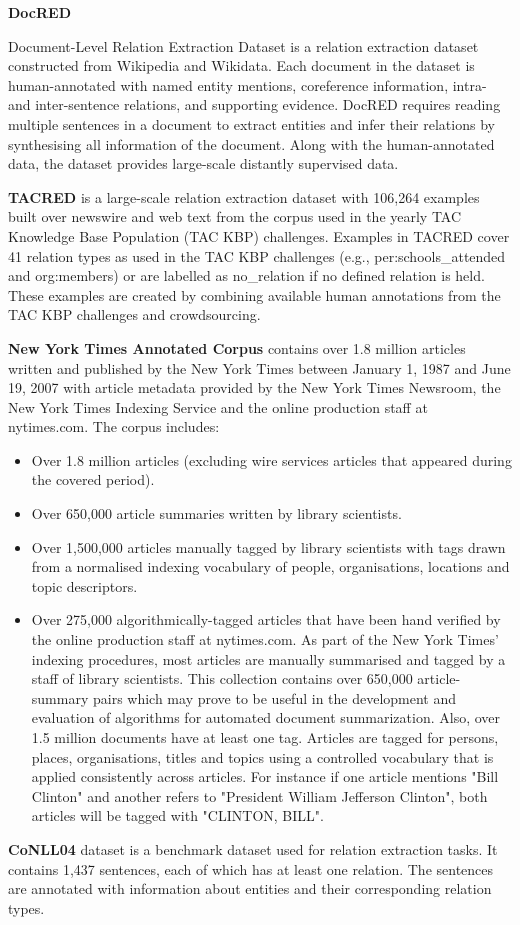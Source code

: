 \documentclass[twocolumn, 11pt]{extarticle}
\begin{document}
\textbf{DocRED}

Document-Level Relation Extraction Dataset is a relation extraction dataset constructed from Wikipedia and Wikidata. Each document in the dataset is human-annotated with named entity mentions, coreference information, intra- and inter-sentence relations, and supporting evidence. DocRED requires reading multiple sentences in a document to extract entities and infer their relations by synthesising all information of the document. Along with the human-annotated data, the dataset provides large-scale distantly supervised data.

\textbf{TACRED} 
is a large-scale relation extraction dataset with 106,264 examples built over newswire and web text from the corpus used in the yearly TAC Knowledge Base Population (TAC KBP) challenges. Examples in TACRED cover 41 relation types as used in the TAC KBP challenges (e.g., per:schools\_attended and org:members) or are labelled as no\_relation if no defined relation is held. These examples are created by combining available human annotations from the TAC KBP challenges and crowdsourcing.

\textbf{New York Times Annotated Corpus} contains over 1.8 million articles written and published by the New York Times between January 1, 1987 and June 19, 2007 with article metadata provided by the New York Times Newsroom, the New York Times Indexing Service and the online production staff at nytimes.com. The corpus includes:

\begin{itemize}
    \item Over 1.8 million articles (excluding wire services articles that appeared during the covered period).
    \item Over 650,000 article summaries written by library scientists.
    \item Over 1,500,000 articles manually tagged by library scientists with tags drawn from a normalised indexing vocabulary of people, organisations, locations and topic descriptors.
    \item Over 275,000 algorithmically-tagged articles that have been hand verified by the online production staff at nytimes.com. As part of the New York Times' indexing procedures, most articles are manually summarised and tagged by a staff of library scientists. This collection contains over 650,000 article-summary pairs which may prove to be useful in the development and evaluation of algorithms for automated document summarization. Also, over 1.5 million documents have at least one tag. Articles are tagged for persons, places, organisations, titles and topics using a controlled vocabulary that is applied consistently across articles. For instance if one article mentions "Bill Clinton" and another refers to "President William Jefferson Clinton", both articles will be tagged with "CLINTON, BILL".
\end{itemize}
\textbf{CoNLL04} dataset is a benchmark dataset used for relation extraction tasks. It contains 1,437 sentences, each of which has at least one relation. The sentences are annotated with information about entities and their corresponding relation types.
\end{document}
